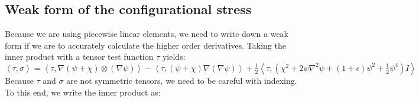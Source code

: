 \documentclass[reqno]{article}
\begin{document}
\subsection{Weak form of the configurational stress}
Because we are using piecewise linear elements, we need to write down a weak form if we are to accurately calculate the higher order derivatives.
Taking the inner product with a tensor test function $\tau$ yields:
\begin{equation}
        \left< \tau, \sigma \right>
        =
        \left< \tau, \nabla \left( \psi + \chi \right) \otimes (\nabla \psi) \right>
        - \left< \tau, (\psi + \chi) \nabla(\nabla \psi) \right>
        + \tfrac12 \left< \tau, \left(\chi^2 + 2 \psi \nabla^2 \psi + (1 + \epsilon) \psi^2 + \tfrac12 \psi^4 \right) I \right> 
\end{equation}
Because $\tau$ and $\sigma$ are not symmetric tensors, we need to be careful with indexing.
To this end, we write the inner product as:
\end{document}
